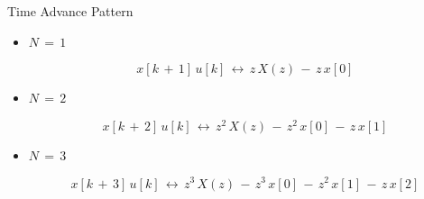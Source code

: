 \begin{frame}[t]{Time Advance Pattern}

\begin{itemize}

\item $N \, = \, 1$

\begin{equation*}
x[k \, + \, 1] \, u[k] \,\leftrightarrow \,  z \, X(z) \, - \, z \, x[0]
\end{equation*}

\item $N \, = \, 2$

\begin{equation*}
x[k \, + \, 2] \, u[k] \,\leftrightarrow \,  z^{2} \, X(z)\, - \, z^{2} \, x[0] \, - \,z \, x[	1]
\end{equation*}


\item $N \, = \, 3$

\begin{equation*}
x[k \, + \, 3] \, u[k] \,\leftrightarrow \,  z^{3} \, X(z)\, - \, z^{3} \, x[0] \, - \, z^{2}\, x[1] \, - \, z\, x[2]
\end{equation*}

\end{itemize}

\end{frame}
